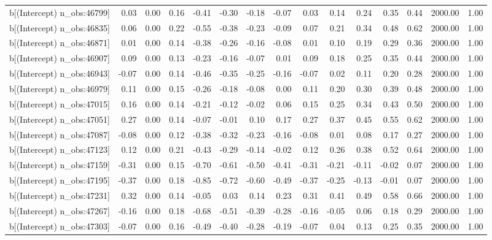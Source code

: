 \begin{table}[ht]
\begin{tabular}{rrrrrrrrrrrrrrr}
  b[(Intercept) n\_obs:46799] & 0.03 & 0.00 & 0.16 & -0.41 & -0.30 & -0.18 & -0.07 & 0.03 & 0.14 & 0.24 & 0.35 & 0.44 & 2000.00 & 1.00 \\ 
  b[(Intercept) n\_obs:46835] & 0.06 & 0.00 & 0.22 & -0.55 & -0.38 & -0.23 & -0.09 & 0.07 & 0.21 & 0.34 & 0.48 & 0.62 & 2000.00 & 1.00 \\ 
  b[(Intercept) n\_obs:46871] & 0.01 & 0.00 & 0.14 & -0.38 & -0.26 & -0.16 & -0.08 & 0.01 & 0.10 & 0.19 & 0.29 & 0.36 & 2000.00 & 1.00 \\ 
  b[(Intercept) n\_obs:46907] & 0.09 & 0.00 & 0.13 & -0.23 & -0.16 & -0.07 & 0.01 & 0.09 & 0.18 & 0.25 & 0.35 & 0.44 & 2000.00 & 1.00 \\ 
  b[(Intercept) n\_obs:46943] & -0.07 & 0.00 & 0.14 & -0.46 & -0.35 & -0.25 & -0.16 & -0.07 & 0.02 & 0.11 & 0.20 & 0.28 & 2000.00 & 1.00 \\ 
  b[(Intercept) n\_obs:46979] & 0.11 & 0.00 & 0.15 & -0.26 & -0.18 & -0.08 & 0.00 & 0.11 & 0.20 & 0.30 & 0.39 & 0.48 & 2000.00 & 1.00 \\ 
  b[(Intercept) n\_obs:47015] & 0.16 & 0.00 & 0.14 & -0.21 & -0.12 & -0.02 & 0.06 & 0.15 & 0.25 & 0.34 & 0.43 & 0.50 & 2000.00 & 1.00 \\ 
  b[(Intercept) n\_obs:47051] & 0.27 & 0.00 & 0.14 & -0.07 & -0.01 & 0.10 & 0.17 & 0.27 & 0.37 & 0.45 & 0.55 & 0.62 & 2000.00 & 1.00 \\ 
  b[(Intercept) n\_obs:47087] & -0.08 & 0.00 & 0.12 & -0.38 & -0.32 & -0.23 & -0.16 & -0.08 & 0.01 & 0.08 & 0.17 & 0.27 & 2000.00 & 1.00 \\ 
  b[(Intercept) n\_obs:47123] & 0.12 & 0.00 & 0.21 & -0.43 & -0.29 & -0.14 & -0.02 & 0.12 & 0.26 & 0.38 & 0.52 & 0.64 & 2000.00 & 1.00 \\ 
  b[(Intercept) n\_obs:47159] & -0.31 & 0.00 & 0.15 & -0.70 & -0.61 & -0.50 & -0.41 & -0.31 & -0.21 & -0.11 & -0.02 & 0.07 & 2000.00 & 1.00 \\ 
  b[(Intercept) n\_obs:47195] & -0.37 & 0.00 & 0.18 & -0.85 & -0.72 & -0.60 & -0.49 & -0.37 & -0.25 & -0.13 & -0.01 & 0.07 & 2000.00 & 1.00 \\ 
  b[(Intercept) n\_obs:47231] & 0.32 & 0.00 & 0.14 & -0.05 & 0.03 & 0.14 & 0.23 & 0.31 & 0.41 & 0.49 & 0.58 & 0.66 & 2000.00 & 1.00 \\ 
  b[(Intercept) n\_obs:47267] & -0.16 & 0.00 & 0.18 & -0.68 & -0.51 & -0.39 & -0.28 & -0.16 & -0.05 & 0.06 & 0.18 & 0.29 & 2000.00 & 1.00 \\ 
  b[(Intercept) n\_obs:47303] & -0.07 & 0.00 & 0.16 & -0.49 & -0.40 & -0.28 & -0.19 & -0.07 & 0.04 & 0.13 & 0.25 & 0.35 & 2000.00 & 1.00 \\ 

\end{tabular}
\end{table}
